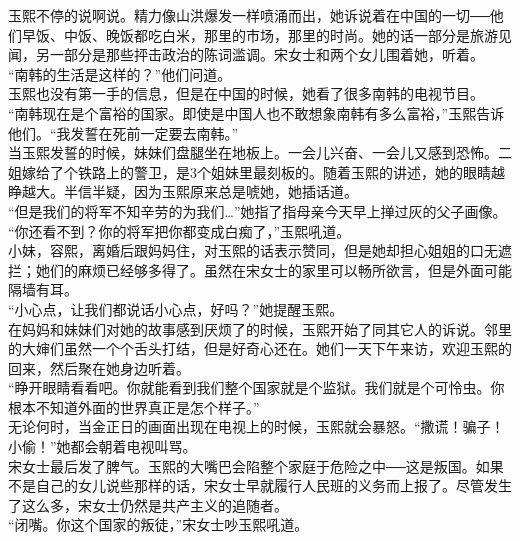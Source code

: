 玉熙不停的说啊说。精力像山洪爆发一样喷涌而出，她诉说着在中国的一切──他们早饭、中饭、晚饭都吃白米，那里的市场，那里的时尚。她的话一部分是旅游见闻，另一部分是那些抨击政治的陈词滥调。宋女士和两个女儿围着她，听着。\\

“南韩的生活是这样的？”他们问道。\\

玉熙也没有第一手的信息，但是在中国的时候，她看了很多南韩的电视节目。\\

“南韩现在是个富裕的国家。即使是中国人也不敢想象南韩有多么富裕，”玉熙告诉他们。“我发誓在死前一定要去南韩。”\\

当玉熙发誓的时候，妹妹们盘腿坐在地板上。一会儿兴奋、一会儿又感到恐怖。二姐嫁给了个铁路上的警卫，是3个姐妹里最刻板的。随着玉熙的讲述，她的眼睛越睁越大。半信半疑，因为玉熙原来总是唬她，她插话道。\\

“但是我们的将军不知辛劳的为我们…”她指了指母亲今天早上掸过灰的父子画像。\\

“你还看不到？你的将军把你都变成白痴了，”玉熙吼道。\\

小妹，容熙，离婚后跟妈妈住，对玉熙的话表示赞同，但是她却担心姐姐的口无遮拦；她们的麻烦已经够多得了。虽然在宋女士的家里可以畅所欲言，但是外面可能隔墙有耳。\\

“小心点，让我们都说话小心点，好吗？”她提醒玉熙。\\

在妈妈和妹妹们对她的故事感到厌烦了的时候，玉熙开始了同其它人的诉说。邻里的大婶们虽然一个个舌头打结，但是好奇心还在。她们一天下午来访，欢迎玉熙的回来，然后聚在她身边听着。\\

“睁开眼睛看看吧。你就能看到我们整个国家就是个监狱。我们就是个可怜虫。你根本不知道外面的世界真正是怎个样子。”\\

无论何时，当金正日的画面出现在电视上的时候，玉熙就会暴怒。“撒谎！骗子！小偷！”她都会朝着电视叫骂。\\

宋女士最后发了脾气。玉熙的大嘴巴会陷整个家庭于危险之中──这是叛国。如果不是自己的女儿说些那样的话，宋女士早就履行人民班的义务而上报了。尽管发生了这么多，宋女士仍然是共产主义的追随者。\\

“闭嘴。你这个国家的叛徒，”宋女士吵玉熙吼道。\\

